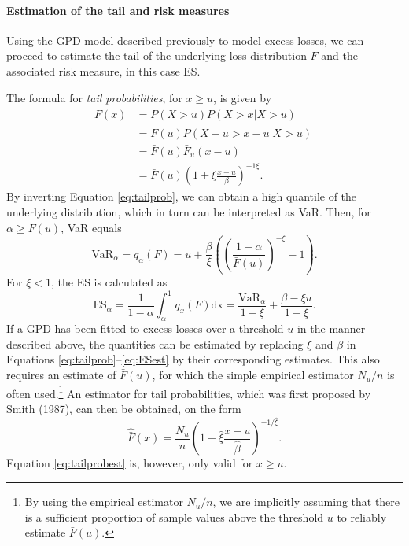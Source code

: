 \documentclass[a4paper,11pt]{article}
\theoremstyle{definition}
\theoremstyle{definition}
\theoremstyle{definition}
\theoremstyle{definition}
\theoremstyle{remark}
\begin{document}
\hypertarget{estimation-of-the-tail-and-risk-measures}{%
\paragraph{Estimation of the tail and risk measures}\label{estimation-of-the-tail-and-risk-measures}}

Using the GPD model described previously to model excess losses, we can proceed to estimate the tail of the underlying loss distribution \(F\) and the associated risk measure, in this case ES.

The formula for \emph{tail probabilities}, for \(x \geq u\), is given by
\begin{equation}
\begin{aligned}
\bar F (x) &= P(X >u)P(X > x \vert X >u)\ \\
& = \bar F (u)P(X-u > x- u \vert X > u)\ \\
& = \bar F (u) \bar F_u (x-u)\ \\
& = \bar F (u) \left(1 + \xi \frac{x-u}{\beta} \right)^{-1\xi}.
\end{aligned}
\label{eq:tailprob}
\end{equation}
By inverting Equation \eqref{eq:tailprob}, we can obtain a high quantile of the underlying distribution, which in turn can be interpreted as VaR. Then, for \(\alpha \geq F(u)\), VaR equals
\begin{equation}
\text{VaR}_{\alpha} = q_{\alpha}(F) = u + \frac{\beta}{\xi} \left( \left (  \frac{1-\alpha}{\bar F(u)}  \right)^{-\xi} -1 \right).
\label{eq:VaRest}
\end{equation}
For \(\xi < 1\), the ES is calculated as
\begin{equation}
\text{ES}_{\alpha} = \frac{1}{1-\alpha} \int_{\alpha}^{1} q_{x}(F)\text{dx} = \frac{\text{VaR}_{\alpha}}{1 - \xi} + \frac{\beta - \xi u}{1 - \xi}.
\label{eq:ESest}
\end{equation}
If a GPD has been fitted to excess losses over a threshold \(u\) in the manner described above, the quantities can be estimated by replacing \(\xi\) and \(\beta\) in Equations \eqref{eq:tailprob}--\eqref{eq:ESest} by their corresponding estimates. This also requires an estimate of \(\bar F(u)\), for which the simple empirical estimator \(N_u/n\) is often used.\footnote{By using the empirical estimator \(N_u/n\), we are implicitly assuming that there is a sufficient proportion of sample values above the threshold \(u\) to reliably estimate \(\bar F(u)\).} An estimator for tail probabilities, which was first proposed by Smith (1987), can then be obtained, on the form
\begin{equation}
\hat{\bar{{F}}}(x) = \frac{N_u}{n}\left(1 + \hat \xi \frac{x - u}{\hat \beta} \right)^{-1/ \hat \xi}.
\label{eq:tailprobest}
\end{equation}
Equation \eqref{eq:tailprobest} is, however, only valid for \(x \geq u\).
\end{document}
